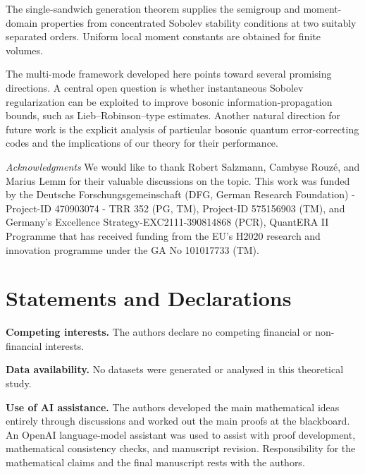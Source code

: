 \documentclass[11pt]{article}
\theoremstyle{myplain}
\theoremstyle{mydefinition}
\theoremstyle{remark}
\DeclareMathOperator{\1}{\mathds{1}}
\begin{document}
    The single-sandwich generation theorem supplies the semigroup and moment-domain properties from concentrated Sobolev stability conditions at two suitably separated orders. Uniform local moment constants are obtained for finite volumes.

    The multi-mode framework developed here points toward several promising directions. A central open question is whether instantaneous Sobolev regularization can be exploited to improve bosonic information-propagation bounds, such as Lieb–Robinson–type estimates. Another natural direction for future work is the explicit analysis of particular bosonic quantum error-correcting codes and the implications of our theory for their performance.




    \vspace{2ex}
    \emph{Acknowledgments} We would like to thank Robert Salzmann, Cambyse Rouzé, and Marius Lemm for their valuable discussions on the topic. This work was funded by the Deutsche Forschungsgemeinschaft (DFG, German Research Foundation) - Project-ID 470903074 - TRR 352 (PG, TM), Project-ID 575156903 (TM), and  Germany’s Excellence Strategy-EXC2111-390814868 (PCR), QuantERA II Programme that has received funding from the EU’s H2020 research and innovation programme under the GA No 101017733 (TM).


\section*{Statements and Declarations}
    \noindent\textbf{Competing interests.} The authors declare no competing financial or non-financial interests.

    \noindent\textbf{Data availability.} No datasets were generated or analysed in this theoretical study.

    \noindent\textbf{Use of AI assistance.} The authors developed the main mathematical ideas entirely through discussions and worked out the main proofs at the blackboard. An OpenAI language-model assistant was used to assist with proof development, mathematical consistency checks, and manuscript revision. Responsibility for the mathematical claims and the final manuscript rests with the authors.





\appendix
{}
\end{document}
